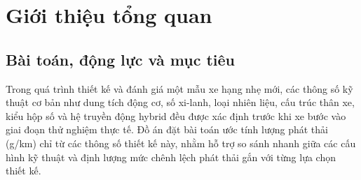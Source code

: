 \section{Giới thiệu tổng quan}
\label{sec:intro}

\subsection{Bài toán, động lực và mục tiêu}
Trong quá trình thiết kế và đánh giá một mẫu xe hạng nhẹ mới, các thông số kỹ thuật cơ bản như dung tích động cơ, số xi-lanh, loại nhiên liệu, cấu trúc thân xe, kiểu hộp số và hệ truyền động hybrid đều được xác định trước khi xe bước vào giai đoạn thử nghiệm thực tế. Đồ án đặt bài toán ước tính lượng phát thải \COtwo{} (g/km) chỉ từ các thông số thiết kế này, nhằm hỗ trợ so sánh nhanh giữa các cấu hình kỹ thuật và định lượng mức chênh lệch phát thải gắn với từng lựa chọn thiết kế.


